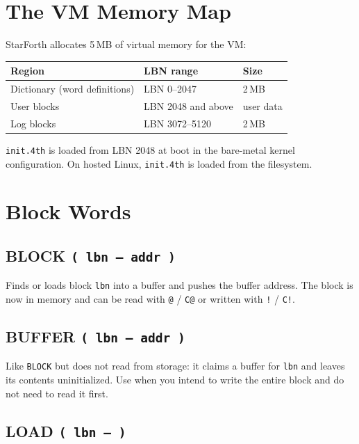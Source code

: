 \section{The VM Memory Map}
\label{sec:memory-map}

StarForth allocates 5\,MB of virtual memory for the VM:

\begin{center}
\begin{tabular}{lll}
\toprule
Region & LBN range & Size \\
\midrule
Dictionary (word definitions) & LBN 0--2047 & 2\,MB \\
User blocks & LBN 2048 and above & user data \\
Log blocks & LBN 3072--5120 & 2\,MB \\
\bottomrule
\end{tabular}
\end{center}

\texttt{init.4th} is loaded from LBN 2048 at boot in the bare-metal kernel
configuration. On hosted Linux, \texttt{init.4th} is loaded from the
filesystem.

\section{Block Words}
\label{sec:block-words}

\subsection*{BLOCK \texttt{( lbn -- addr )}}

Finds or loads block \texttt{lbn} into a buffer and pushes the buffer address.
The block is now in memory and can be read with \texttt{@} / \texttt{C@} or
written with \texttt{!} / \texttt{C!}.

\subsection*{BUFFER \texttt{( lbn -- addr )}}

Like \texttt{BLOCK} but does not read from storage: it claims a buffer for
\texttt{lbn} and leaves its contents uninitialized. Use when you intend to
write the entire block and do not need to read it first.

\subsection*{LOAD \texttt{( lbn -- )}}

